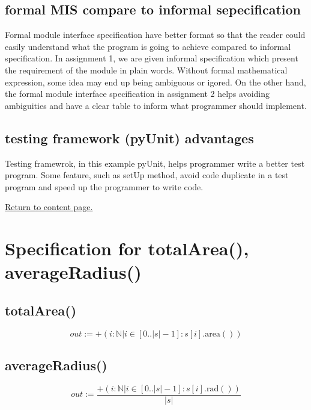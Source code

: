 \documentclass[12pt]{article}
\begin{document}
  \subsection {formal MIS compare to informal sepecification}
  Formal module interface specification have better format
  so that the reader could easily understand what the program
  is going to achieve compared to informal specification. In
  assignment 1, we are given informal specification which
  present the requirement of the module in plain words. Without
  formal mathematical expression, some idea may end up being
  ambiguous or igored. On the other hand, the formal module
  interface specification in assignment 2 helps avoiding 
  ambiguities and have a clear table to inform what programmer
  should implement.

  \subsection {testing  framework (pyUnit) advantages}
  Testing framewrok, in this example pyUnit, helps programmer
  write a better test program. Some feature, such as setUp
  method, avoid code duplicate in a test program and speed 
  up the programmer to write code. 


\vskip 5cm
\hyperlink{toc}{Return to content page.}

\section{Specification for totalArea(), averageRadius()}

  \subsection{totalArea()}
  \begin{displaymath}
  out:= +(i:\mathbb{N}|i\in[0..|s|-1]:s[i].\textrm{area}())
  \end{displaymath}

  \subsection{averageRadius()}
  \begin{displaymath}
  out:= \frac{+(i:\mathbb{N}|i\in[0..|s|-1]:s[i].\textrm{rad}())}
             {|s|}
  \end{displaymath}
\end{document}
